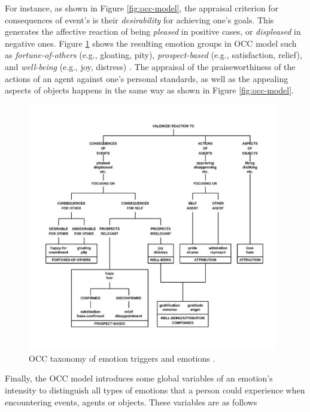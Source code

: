 \documentclass[12pt]{report}
\begin{document}
For instance, as shown in Figure \ref{fig:occ-model}, the appraisal criterion
for consequences of event’s is their \textit{desirability} for achieving one's
goals. This generates the affective reaction of being \textit{pleased} in
positive cases, or \textit{displeased} in negative ones. Figure
\ref{fig:occ-structure} shows the resulting emotion groups in OCC model such as
\textit{fortune-of-others} (e.g., gloating, pity), \textit{prospect-based}
(e.g., satisfaction, relief), and \textit{well-being} (e.g., joy, distress)
\cite{occ:structure}. The appraisal of the praiseworthiness of the actions of an
agent against one's personal standards, as well as the appealing aspects of
objects happens in the same way as shown in Figure \ref{fig:occ-model}.

\begin{figure}[tbh]
  \center
  \includegraphics[width=0.978\textwidth]{figure/occ-structure.jpg}
  \caption{OCC taxonomy of emotion triggers and emotions \cite{occ:structure}.}
  \label{fig:occ-structure}
\end{figure}

Finally, the OCC model introduces some global variables of an emotion's
intensity to distinguish all types of emotions that a person could experience when
encountering events, agents or objects. These variables are as follows
\end{document}
